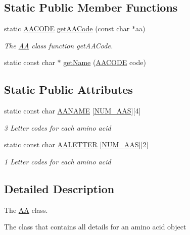 \subsection*{Static Public Member Functions}
\begin{DoxyCompactItemize}
\item 
static \hyperlink{classAA_a8717db02e7eeaac316898736843fa600}{A\-A\-C\-O\-D\-E} \hyperlink{classAA_a4586e72f7a09f932e29188a5098f124f}{get\-A\-A\-Code} (const char $\ast$aa)
\begin{DoxyCompactList}\small\item\em The \hyperlink{classAA}{A\-A} class function get\-A\-A\-Code. \end{DoxyCompactList}\item 
static const char $\ast$ \hyperlink{classAA_a1ae2a562a71d05aa8c1f9b3c7136e3b7}{get\-Name} (\hyperlink{classAA_a8717db02e7eeaac316898736843fa600}{A\-A\-C\-O\-D\-E} code)
\end{DoxyCompactItemize}
\subsection*{Static Public Attributes}
\begin{DoxyCompactItemize}
\item 
static const char \hyperlink{classAA_a979027b32adbcc9f5eabeaf580d243b6}{A\-A\-N\-A\-M\-E} \mbox{[}\hyperlink{pdb_8h_aaa82008f92b935630ccf49c27a4bcc6e}{N\-U\-M\-\_\-\-A\-A\-S}\mbox{]}\mbox{[}4\mbox{]}
\begin{DoxyCompactList}\small\item\em 3 Letter codes for each amino acid \end{DoxyCompactList}\item 
static const char \hyperlink{classAA_ad31fab7fcd16661c068535ca46524a6a}{A\-A\-L\-E\-T\-T\-E\-R} \mbox{[}\hyperlink{pdb_8h_aaa82008f92b935630ccf49c27a4bcc6e}{N\-U\-M\-\_\-\-A\-A\-S}\mbox{]}\mbox{[}2\mbox{]}
\begin{DoxyCompactList}\small\item\em 1 Letter codes for each amino acid \end{DoxyCompactList}\end{DoxyCompactItemize}


\subsection{Detailed Description}
The \hyperlink{classAA}{A\-A} class. 

The class that contains all details for an amino acid object 

